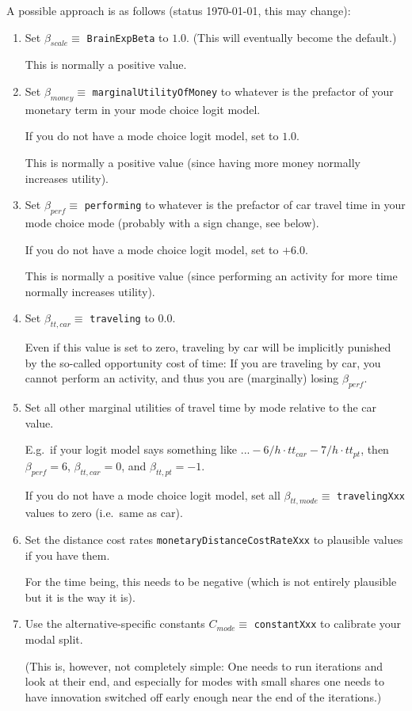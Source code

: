 A possible approach is as follows (status \today, this may change):
\begin{enumerate}

\item Set $\beta_{scale} \equiv$ \verb$BrainExpBeta$ to $1.0$.  (This will eventually become the default.)

This is normally a positive value.

\item Set $\beta_{money} \equiv$ \verb$marginalUtilityOfMoney$ to whatever is the prefactor of your monetary term in your mode choice logit model.

If you do not have a mode choice logit model, set to $1.0$. 

This is normally a positive value (since having more money normally increases utility).

\item Set $\beta_{perf} \equiv$ \verb$performing$ to whatever is the prefactor of car travel time in your mode choice mode (probably with a sign change, see below).

If you do not have a mode choice logit model, set to $+6.0$.

This is normally a positive value (since performing an activity for more time normally increases utility).

\item Set $\beta_{tt,car} \equiv$ \verb$traveling$ to $0.0$.

  Even if this value is set to zero, traveling by car will be implicitly punished by the so-called opportunity cost of time: If you are traveling by car, you cannot perform an activity, and thus you are (marginally) losing $\beta_{perf}$.

\item Set all other marginal utilities of travel time by mode relative to the car value.

E.g.\ if your logit model says something like $... -6/h \cdot tt_{car} - 7/h \cdot tt_{pt}$, then $\beta_{perf} = 6$, $\beta_{tt,car} = 0$, and $\beta_{tt,pt} = -1$.

If you do not have a mode choice logit model, set all $\beta_{tt,mode} \equiv$ \verb$travelingXxx$ values to zero (i.e.\ same as car).

\item Set the distance cost rates \verb$monetaryDistanceCostRateXxx$ to plausible values if you have them.

For the time being, this needs to be negative (which is not entirely plausible but it is the way it is).

\item Use the alternative-specific constants $C_{mode} \equiv$ \verb$constantXxx$ to calibrate your modal split.

(This is, however, not completely simple: One needs to run iterations and look at their end, and especially for modes with small shares one needs to have innovation switched off early enough near the end of the iterations.)

\end{enumerate}

